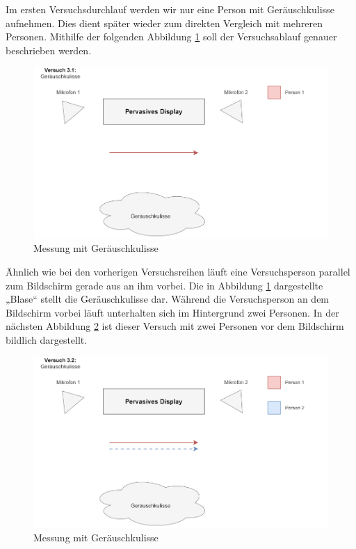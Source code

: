 Im ersten Versuchsdurchlauf werden wir nur eine Person mit Geräuschkulisse aufnehmen. Dies dient später wieder zum direkten Vergleich mit mehreren Personen. Mithilfe der folgenden Abbildung \ref{versuch3.1} soll der Versuchsablauf genauer beschrieben werden.

 
\begin{figure}[H]
	\begin{center}
		\includegraphics[width=\textwidth]{images/Versuch 3.1.PNG}
		\caption{Messung mit Geräuschkulisse}
	\label{versuch3.1}
	\end{center}
\end{figure}

Ähnlich wie bei den vorherigen Versuchsreihen läuft eine Versuchsperson parallel zum Bildschirm gerade aus an ihm vorbei. Die in Abbildung \ref{versuch3.1} dargestellte „Blase“ stellt die Geräuschkulisse dar. Während die Versuchsperson an dem Bildschirm vorbei läuft unterhalten sich im Hintergrund zwei Personen. In der nächsten Abbildung \ref{versuch3.2} ist dieser Versuch mit zwei Personen vor dem Bildschirm bildlich dargestellt.

 
\begin{figure}[H]
	\begin{center}
		\includegraphics[width=\textwidth]{images/Versuch 3.2.PNG}
		\caption{Messung mit Geräuschkulisse}
	\label{versuch3.2}
	\end{center}
\end{figure}

